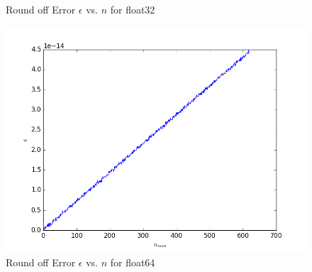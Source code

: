 \documentclass[12pt]{article}
\newenvironment{problem}[2][Problem]{\begin{trivlist}
\item[\hskip \labelsep {\bfseries #1}\hskip \labelsep {\bfseries #2.}]}{\end{trivlist}}
\begin{document}
\begin{problem}{1}
\begin{figure}[H]
 \caption{Round off Error $\epsilon$ vs. $n$ for float32}
\label{label}
\end{figure}
\begin{figure}[H]
\centering
  \includegraphics[scale=0.65]{p1_f64.png}
 \caption{Round off Error $\epsilon$ vs. $n$ for float64}
\label{label}
\end{figure}
\end{problem}
\end{document}
